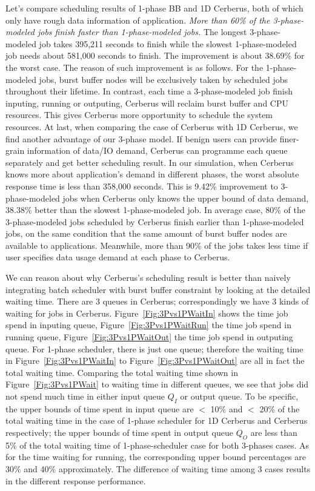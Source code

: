 Let's compare scheduling results of 1-phase BB and 1D Cerberus,
both of which only have rough data information of application.
\textit{More than 60\% of the 3-phase-modeled jobs finish faster than 1-phase-modeled jobs.}
The longest 3-phase-modeled job takes 395,211 seconds to finish
while the slowest 1-phase-modeled job needs about 581,000 seconds to finish.
The improvement is about 38.69\% for the worst case.
The reason of such improvement is as follows.
For the 1-phase-modeled jobs, burst buffer nodes will be exclusively taken by scheduled jobs
throughout their lifetime.
In contrast, each time a 3-phase-modeled job finish inputing, running or outputing,
Cerberus will reclaim burst buffer and CPU resources.
This gives Cerberus more opportunity to schedule the system resources.
At last, when comparing the case of Cerberus with 1D Cerberus,
we find another advantage of our 3-phase model.
If benign users can provide finer-grain information of data/IO demand,
Cerberus can programme each queue separately and get better scheduling result.
In our simulation, when Cerberus knows more about application's demand in different phases,
the worst absolute response time is less than 358,000 seconds.
This is 9.42\% improvement to 3-phase-modeled jobs
when Cerberus only knows the upper bound of data demand,
38.38\% better than the slowest 1-phase-modeled job.
In average case, 80\% of the 3-phase-modeled jobs scheduled by Cerberus
finish earlier than 1-phase-modeled jobs,
on the same condition that the same amount of burst buffer nodes are available to applications.
Meanwhile, more than 90\% of the jobs takes less time if user specifies data usage demand
at each phase to Cerberus.

We can reason about why Cerberus's scheduling result is better than
naively integrating batch scheduler with burst buffer constraint
by looking at the detailed waiting time.
There are 3 queues in Cerberus;
correspondingly we have 3 kinds of waiting for jobs in Cerberus.
Figure~\ref{Fig:3Pvs1PWaitIn} shows the time job spend in inputing queue,
Figure~\ref{Fig:3Pvs1PWaitRun} the time job spend in running queue,
Figure~\ref{Fig:3Pvs1PWaitOut} the time job spend in outputing queue.
For 1-phase scheduler, there is just one queue;
therefore the waiting time in Figure~\ref{Fig:3Pvs1PWaitIn} to
Figure~\ref{Fig:3Pvs1PWaitOut} are all in fact the total waiting time.
Comparing the total waiting time shown in Figure~\ref{Fig:3Pvs1PWait}
to waiting time in different queues,
we see that jobs did not spend much time in either input queue $Q_I$ or output queue.
To be specific, the upper bounds of time spent in input queue are
$<$ 10\% and $<$ 20\% of the total waiting time in the case of 1-phase scheduler
for 1D Cerberus and Cerberus respectively;
the upper bounds of time spent in output queue $Q_O$ are
less than 5\% of the total waiting time of 1-phase-scheduler case
for both 3-phases cases.
As for the time waiting for running, the corresponding upper bound percentages
are 30\% and 40\% approximately.
The difference of waiting time among 3 cases results in the different
response performance.


